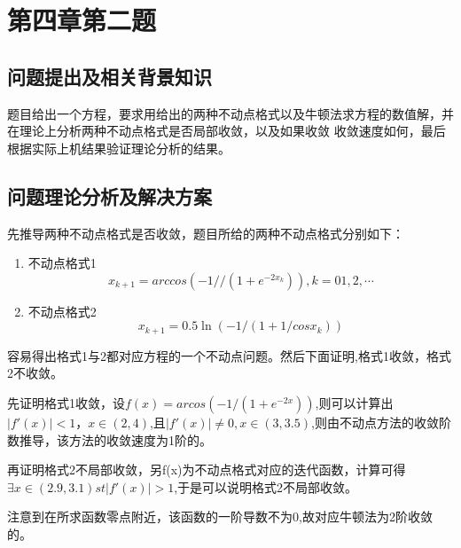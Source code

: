 \documentclass{ctexart}
\begin{document}
\section{第四章第二题}
\subsection{问题提出及相关背景知识}
题目给出一个方程，要求用给出的两种不动点格式以及牛顿法求方程的数值解，并在理论上分析两种不动点格式是否局部收敛，以及如果收敛
收敛速度如何，最后根据实际上机结果验证理论分析的结果。
\subsection{问题理论分析及解决方案}
先推导两种不动点格式是否收敛，题目所给的两种不动点格式分别如下：
\begin{enumerate}
	\item 不动点格式1
	\[x_{k+1}=arccos(-1//(1+e^{-2x_k})),k=01,2,\cdots \]
	\item 不动点格式2
	\[x_{k+1}=0.5\ln(-1/(1+1/cosx_k))\]
\end{enumerate}
容易得出格式1与2都对应方程的一个不动点问题。然后下面证明,格式1收敛，格式2不收敛。

先证明格式1收敛，设$f(x)=arcos(-1/(1+e^{-2x}))$,则可以计算出$|f'(x)|<1，x \in (2,4)$,且$|f'(x)|\neq 0,x\in (3,3.5)$,则由不动点方法的收敛阶数推导，该方法的收敛速度为1阶的。

再证明格式2不局部收敛，另f(x)为不动点格式对应的迭代函数，计算可得$\exists x\in (2.9,3.1) st |f'(x)|>1$,于是可以说明格式2不局部收敛。

注意到在所求函数零点附近，该函数的一阶导数不为0,故对应牛顿法为2阶收敛的。
\end{document}

